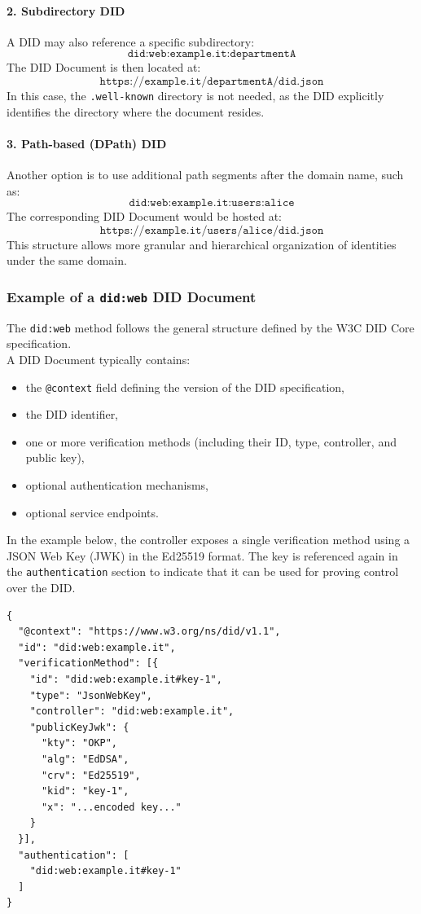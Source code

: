 \paragraph{2. Subdirectory DID}  
A DID may also reference a specific subdirectory:
\[
\texttt{did:web:example.it:departmentA}
\]
The DID Document is then located at:
\[
\texttt{https://example.it/departmentA/did.json}
\]
In this case, the \texttt{.well-known} directory is not needed, as the DID explicitly identifies the directory where the document resides.

\paragraph{3. Path-based (DPath) DID}  
Another option is to use additional path segments after the domain name, such as:
\[
\texttt{did:web:example.it:users:alice}
\]
The corresponding DID Document would be hosted at:
\[
\texttt{https://example.it/users/alice/did.json}
\]
This structure allows more granular and hierarchical organization of identities under the same domain.

\subsubsection*{Example of a \texttt{did:web} DID Document}

The \texttt{did:web} method follows the general structure defined by the W3C DID Core specification.\\
A DID Document typically contains:
\begin{itemize}
    \item the \texttt{@context} field defining the version of the DID specification,
    \item the DID identifier,
    \item one or more verification methods (including their ID, type, controller, and public key),
    \item optional authentication mechanisms,
    \item optional service endpoints.
\end{itemize}

\noindent
In the example below, the controller exposes a single verification method using a JSON Web Key (JWK) in the Ed25519 format. The key is referenced again in the \texttt{authentication} section to indicate that it can be used for proving control over the DID.

\begin{verbatim}
{
  "@context": "https://www.w3.org/ns/did/v1.1",
  "id": "did:web:example.it",
  "verificationMethod": [{
    "id": "did:web:example.it#key-1",
    "type": "JsonWebKey",
    "controller": "did:web:example.it",
    "publicKeyJwk": {
      "kty": "OKP",
      "alg": "EdDSA",
      "crv": "Ed25519",
      "kid": "key-1",
      "x": "...encoded key..."
    }
  }],
  "authentication": [
    "did:web:example.it#key-1"
  ]
}
\end{verbatim}

